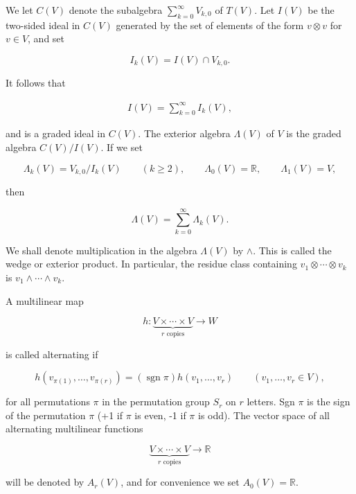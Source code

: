 \begin{definition}\label{thm:2.4}
We let $C(V)$ denote the subalgebra $\sum_{k=0}^{\infty} V_{k,0}$ of $T(V)$. Let $I(V)$ be the two-sided ideal in $C(V)$ generated by the set of elements of the form $v\otimes v$ for $v\in V$, and set

\begin{equation}
\tag{1}\label{eq:2.4:1}
I_{k}(V)=I(V)\cap V_{k,0}.
\end{equation}

It follows that

\begin{equation}
\tag{2}\label{eq:2.4:2}
\begin{array}{r}{I(V)=\displaystyle\sum_{k=0}^{\infty}I_{k}(V),}\end{array}
\end{equation}

and is a graded ideal in $C(V)$. The exterior algebra $\Lambda(V)$ of $V$ is the graded algebra $C(V)/I(V)$. If we set 

\begin{equation}
\tag{3}\label{eq:2.4:3}
\Lambda_{k}(V)=V_{k,0}/I_{k}(V)\qquad(k\geq2),\qquad\Lambda_{0}(V)=\mathbb{R},\qquad\Lambda_{1}(V)=V,
\end{equation}

then

\begin{equation}
\tag{4}\label{eq:2.4:4}
\Lambda(V)=\sum_{k=0}^{\infty}\Lambda_{k}(V).
\end{equation}

We shall denote multiplication in the algebra $\Lambda(V)$ by $\wedge$. This is called the wedge or exterior product. In particular, the residue class containing $v_1\otimes\cdots\otimes v_k$ is $v_1\wedge\cdots\wedge v_k$. 

\end{definition}

\begin{definition}\label{thm:2.5}
A multilinear map

\[
h\colon\underbrace{V\times\cdots\times V}_{r\text{ copies}}\to W
\]

is called alternating if

\[
h(v_{\pi(1)},\ldots,v_{\pi(r)})=(\operatorname{sgn}\pi)h(v_{1},\ldots,v_{r})\qquad(v_{1},\ldots,v_{r}\in V),
\]

for all permutations $\pi$ in the permutation group $S_{r}$ on $r$ letters. Sgn $\pi$ is the sign of the permutation $\pi$ (+1 if $\pi$ is even, -1 if $\pi$ is odd). The vector space of all alternating multilinear functions

\[
\underbrace{V\times\cdots\times V}_{r\text{ copies}}\to\mathbb{R}
\]

will be denoted by  $ A_r(V) $, and for convenience we set  $ A_0(V) = \mathbb{R} $.

\end{definition}

